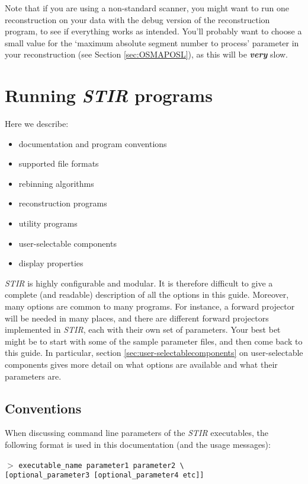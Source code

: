 \documentclass{article}
\newcommand{\cmdline}[1]{\par \noindent $>$ \texttt{#1}\par}
\begin{document}
Note that if you are using a non-standard scanner, 
you might want to run one reconstruction on your data with 
the debug version of the reconstruction program, to see if everything 
works as intended. You'll probably want to choose a small value 
for the `maximum absolute segment number to process' parameter 
in your reconstruction (see Section \ref{sec:OSMAPOSL}), as this will be \textbf{\textit{very}} 
slow.




\section{
Running \textit{STIR} programs}

Here we describe:
\begin{itemize}
\item documentation and program conventions
\item supported file formats 
\item rebinning algorithms
\item reconstruction programs
\item utility programs
\item user-selectable components
\item display properties
\end{itemize}

\textit{STIR} is highly configurable and modular. It is therefore difficult to give a complete (and readable)
description of all the options in this guide. Moreover, many options are common to many
programs. For instance, a forward projector will be needed in many places, and there are 
different forward projectors implemented in \textit{STIR}, each with their own set of 
parameters. Your best bet might be to start with some of the sample parameter files, and then
come back to this guide. In particular, section \ref{sec:user-selectablecomponents}
on user-selectable components gives more detail on what options are available
and what their parameters are.

\subsection{
Conventions}
\label{sec:conventions}
When discussing command line parameters of the \textit{STIR} executables, 
the following format is used in this documentation (and the usage messages):
\cmdline{executable\_name parameter1 parameter2 {\textbackslash}\\
{[}optional\_parameter3 [optional\_parameter4 etc]]}
\end{document}
